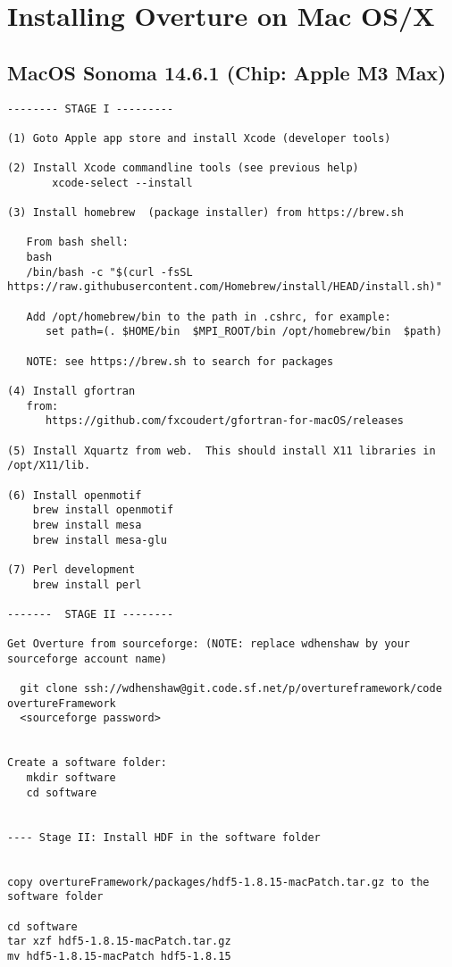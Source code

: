 \section{Installing Overture on Mac OS/X}  \label{sec:installMac}


\subsection{MacOS Sonoma 14.6.1  (Chip: Apple M3 Max)} 


\begin{Verbatim}[fontsize=\footnotesize]
-------- STAGE I ---------

(1) Goto Apple app store and install Xcode (developer tools)

(2) Install Xcode commandline tools (see previous help)
       xcode-select --install    

(3) Install homebrew  (package installer) from https://brew.sh

   From bash shell: 
   bash
   /bin/bash -c "$(curl -fsSL https://raw.githubusercontent.com/Homebrew/install/HEAD/install.sh)"

   Add /opt/homebrew/bin to the path in .cshrc, for example:
      set path=(. $HOME/bin  $MPI_ROOT/bin /opt/homebrew/bin  $path)

   NOTE: see https://brew.sh to search for packages

(4) Install gfortran
   from:
      https://github.com/fxcoudert/gfortran-for-macOS/releases

(5) Install Xquartz from web.  This should install X11 libraries in /opt/X11/lib.

(6) Install openmotif
    brew install openmotif
    brew install mesa
    brew install mesa-glu

(7) Perl development 
    brew install perl
    
-------  STAGE II --------

Get Overture from sourceforge: (NOTE: replace wdhenshaw by your sourceforge account name)

  git clone ssh://wdhenshaw@git.code.sf.net/p/overtureframework/code overtureFramework
  <sourceforge password>


Create a software folder:
   mkdir software
   cd software


---- Stage II: Install HDF in the software folder


copy overtureFramework/packages/hdf5-1.8.15-macPatch.tar.gz to the software folder

cd software
tar xzf hdf5-1.8.15-macPatch.tar.gz
mv hdf5-1.8.15-macPatch hdf5-1.8.15


\end{Verbatim}

